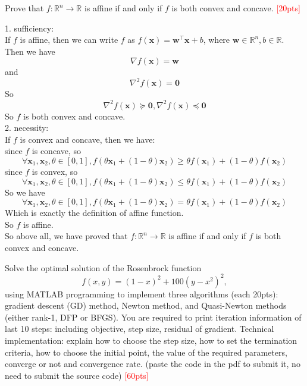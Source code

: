 \documentclass[10pt]{article}
\newenvironment{problem}[2][Problem]{\begin{trivlist}
\item[\hskip \labelsep {\bfseries #1}\hskip \labelsep {\bfseries #2.}]}{\end{trivlist}}
\begin{document}
\newpage

\begin{problem}{2}
    Prove that $f: \mathbb{R}^n \rightarrow \mathbb{R}$ is affine if and only if $f$ is both convex and concave. \textcolor{red}{[20pts]} 
\end{problem}

1. sufficiency:\\
If $f$ is affine, then we can write $f$ as $f(\pmb x)=\pmb w^{\top}\pmb x+b$, where $\pmb w\in \mathbb{R}^n, b\in \mathbb{R}$.\\
Then we have $$\nabla f(\pmb x)=\pmb w$$
and $$\nabla^2 f(\pmb x)=\pmb 0$$
So
$$\nabla^2 f(\pmb x) \succeq \pmb 0, \nabla^2 f(\pmb x) \preceq \pmb 0$$
So $f$ is both convex and concave.\\

2. necessity:\\
If $f$ is convex and concave, then we have:\\
since $f$ is concave, so $$\forall \pmb x_1,\pmb x_2, \theta\in [0,1], f(\theta\pmb x_1+(1-\theta)\pmb x_2)\geq \theta f(\pmb x_1)+(1-\theta)f(\pmb x_2)$$
since $f$ is convex, so $$\forall \pmb x_1,\pmb x_2, \theta\in [0,1], f(\theta\pmb x_1+(1-\theta)\pmb x_2)\leq \theta f(\pmb x_1)+(1-\theta)f(\pmb x_2)$$
So we have $$\forall \pmb x_1,\pmb x_2, \theta\in [0,1], f(\theta\pmb x_1+(1-\theta)\pmb x_2)= \theta f(\pmb x_1)+(1-\theta)f(\pmb x_2)$$
Which is exactly the definition of affine function.\\
So $f$ is affine.\\
 
So above all, we have proved that $f:\mathbb{R}^n\rightarrow \mathbb{R}$ is affine if and only if $f$ is both convex and concave.

\newpage

\begin{problem}{3}
    Solve the optimal solution of the Rosenbrock function $$f(x, y) = (1 - x)^2 + 100(y - x^2)^2, $$ using MATLAB programming to implement three algorithms (each 20pts): gradient descent (GD) method, Newton method, and Quasi-Newton methods (either rank-1, DFP or BFGS). You are required to print iteration information of last 10 steps: including objective, step size, residual of gradient. Technical implementation: explain how to choose the step size, how to set the termination criteria, how to choose the initial point, the value of the required parameters, converge or not and convergence rate. (paste the code in the pdf to submit it, no need to submit the source code) \textcolor{red}{[60pts]}
\end{problem}
\end{document}
